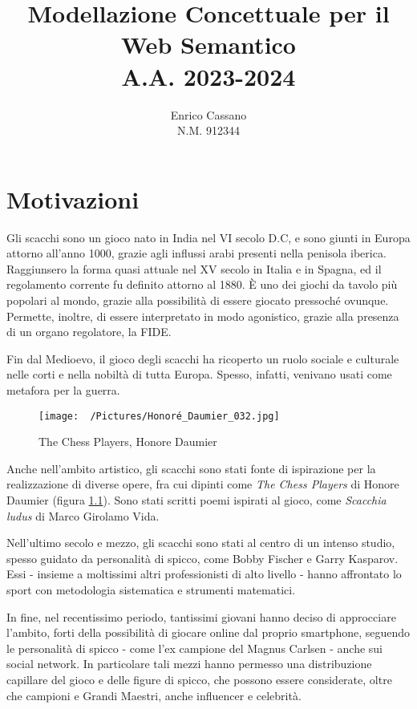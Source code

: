 \documentclass[12pt]{book}
\title{Modellazione Concettuale per il Web Semantico \\ A.A. 2023-2024}
\author{Enrico Cassano \\ N.M. 912344}
\date{}
\begin{document}
\maketitle

\tableofcontents

\chapter{Motivazioni}

Gli scacchi sono un gioco nato in India nel VI secolo D.C, e sono
giunti in Europa attorno all'anno 1000, grazie agli influssi arabi
presenti nella penisola iberica. Raggiunsero la forma quasi attuale nel XV
secolo in Italia e in Spagna, ed il regolamento corrente fu definito
attorno al 1880. È uno dei giochi da tavolo più popolari al mondo,
grazie alla possibilità di essere giocato pressoché ovunque. Permette,
inoltre, di essere interpretato in modo agonistico,
grazie alla presenza di un organo regolatore, la FIDE.

Fin dal Medioevo, il gioco degli scacchi ha ricoperto un ruolo sociale
e culturale nelle corti e nella nobiltà di tutta Europa. Spesso, infatti,
venivano usati come metafora per la guerra.


\begin{figure}[h]
  \caption{The Chess Players, Honore Daumier}
  \centering
  \label{fig:chessplayers}
  \texttt{[image: ~/Pictures/Honoré\_Daumier\_032.jpg]}
\end{figure} 

Anche nell'ambito artistico, gli scacchi sono stati fonte di
ispirazione per la realizzazione di diverse opere, fra cui dipinti
come \textit{The Chess Players} di Honore Daumier (figura
\ref{fig:chessplayers}). Sono stati scritti poemi ispirati al gioco,
come \textit{Scacchia ludus} di Marco Girolamo Vida.

Nell'ultimo secolo e mezzo, gli scacchi sono stati al centro di un intenso studio,
spesso guidato da personalità di spicco, come Bobby Fischer e Garry
Kasparov. Essi - insieme a moltissimi altri professionisti di alto
livello - hanno affrontato lo
sport con metodologia sistematica e strumenti matematici.

In fine, nel recentissimo periodo, tantissimi giovani hanno deciso di
approcciare l'ambito, forti della possibilità di
giocare online dal proprio smartphone, seguendo le 
personalità di spicco - come l'ex campione del Magnus Carlsen - 
anche sui social network. In particolare tali mezzi hanno permesso una
distribuzione capillare del gioco e delle figure di spicco, che
possono essere considerate, oltre che campioni e Grandi Maestri, anche 
influencer e celebrità.
\end{document}
